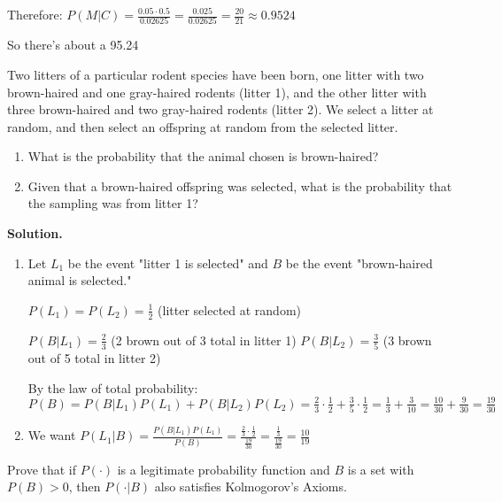 Therefore:
$P(M|C) = \frac{0.05 \cdot 0.5}{0.02625} = \frac{0.025}{0.02625} = \frac{20}{21} \approx 0.9524$

So there's about a 95.24%


\begin{problembox}
Two litters of a particular rodent species have been born, one litter with two brown-haired and one gray-haired rodents (litter 1), and the other litter with three brown-haired and two gray-haired rodents (litter 2). We select a litter at random, and then select an offspring at random from the selected litter.
\begin{enumerate}[label=(\alph*)]
    \item What is the probability that the animal chosen is brown-haired?
    \item Given that a brown-haired offspring was selected, what is the probability that the sampling was from litter 1?
\end{enumerate}
\end{problembox}

\noindent\textbf{Solution.}
\begin{enumerate}[label=(\alph*)]
    \item Let $L_1$ be the event "litter 1 is selected" and $B$ be the event "brown-haired animal is selected."
    
    $P(L_1) = P(L_2) = \frac{1}{2}$ (litter selected at random)
    
    $P(B|L_1) = \frac{2}{3}$ (2 brown out of 3 total in litter 1)
    $P(B|L_2) = \frac{3}{5}$ (3 brown out of 5 total in litter 2)
    
    By the law of total probability:
    $P(B) = P(B|L_1)P(L_1) + P(B|L_2)P(L_2) = \frac{2}{3} \cdot \frac{1}{2} + \frac{3}{5} \cdot \frac{1}{2} = \frac{1}{3} + \frac{3}{10} = \frac{10}{30} + \frac{9}{30} = \frac{19}{30}$
    
    \item We want $P(L_1|B) = \frac{P(B|L_1)P(L_1)}{P(B)} = \frac{\frac{2}{3} \cdot \frac{1}{2}}{\frac{19}{30}} = \frac{\frac{1}{3}}{\frac{19}{30}} = \frac{10}{19}$
\end{enumerate}


\begin{problembox}
Prove that if $P(\cdot)$ is a legitimate probability function and $B$ is a set with $P(B)>0$, then $P(\cdot|B)$ also satisfies Kolmogorov's Axioms.
\end{problembox}

